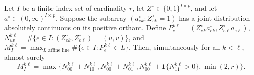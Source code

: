 Let \(I\) be a finite index set of cardinality \(r\), let \(Z^\circ\in\{0,1\}^{I\times p}\), and let \(a^\circ\in(0,\infty)^{I\times p}\). Suppose the subarray \((a^\circ_{ek}:Z^\circ_{ek}=1)\) has a joint distribution absolutely continuous on its positive orthant. Define \(P_e^{k\ell}=(Z^\circ_{ek}a^\circ_{ek},Z^\circ_{e\ell}a^\circ_{e\ell})\), \(N_{uv}^{k\ell}=\#\{e\in I:(Z^\circ_{ek},Z^\circ_{e\ell})=(u,v)\}\), and \(M_I^{k\ell}=\max_{L\text{ affine line}}\#\{e\in I:P_e^{k\ell}\in L\}\). Then, simultaneously for all \(k<\ell\), almost surely
\[
 M_I^{k\ell}=\max\{N_{00}^{k\ell}+N_{10}^{k\ell},N_{00}^{k\ell}+N_{01}^{k\ell},N_{00}^{k\ell}+\mathbf 1\{N_{11}^{k\ell}>0\},\min(2,r)\}.
\]